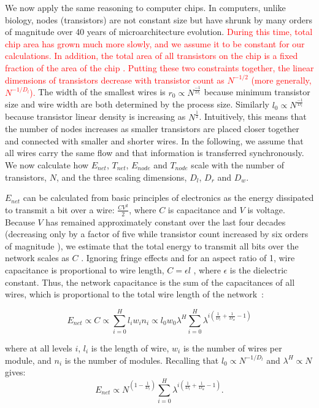 \documentclass[12pt]{article}
\newcommand{\red}[1]{\textcolor{red}{#1}}
\begin{document}
We now apply the same reasoning to computer chips. 
In computers, unlike biology,  nodes (transistors) 
are not constant size but have shrunk by many orders of magnitude over 40
years of microarchitecture evolution.  \red{During this time, total chip area has grown
much more slowly, and we assume it to be constant for our
calculations.   In addition, the total area of all transistors on the
chip is a fixed fraction of the area of the chip \cite{moses08}. 
Putting these two constraints together, the linear dimensions of transistors
decrease with transistor count as $N^{-1/2}$ (more generally,
$N^{-1/D_l}$). } The width of the smallest wires is 
$r_0 \propto N^{\frac{-1}{D_l}}$ because minimum
transistor size and wire width are both determined by the process size.
Similarly $l_0 \propto  N^{\frac{-1}{D_l}}$ because transistor linear density
is increasing as $N^{\frac{1}{2}}$.
Intuitively, this means
that the number of nodes increases as smaller transistors are placed closer
together and connected with smaller and shorter wires. In the following,
we assume that all wires carry the same flow and that information is
transferred synchronously. We now calculate how $E_{net}$, $T_{net}$,
$E_{node}$ and $T_{node}$ scale with the number of transistors, $N$, and the three
scaling dimensions, $D_l$, $D_r$ and $D_w$.

$E_{net}$ can be calculated from basic principles of electronics as the energy
dissipated to transmit a bit over a wire: $\frac{CV^2}{2}$, where $C$ is
capacitance and $V$ is voltage.  Because $V$ has remained approximately
constant over the last four decades (decreasing only by a factor of five while
transistor count increased by six orders of magnitude \cite{ning07}), we
estimate that the total energy to transmit all bits over the network scales as
$C$ \cite{bingham08}.  Ignoring fringe effects and for an aspect ratio of 1,
wire capacitance is proportional to wire length, $C = \epsilon l$
\cite{wilhelm95}, where $\epsilon$ is the dielectric constant. Thus, the
network capacitance is the sum of the capacitances of all wires, which is
proportional to the total wire length of the network~\cite{donath79}:

\begin{equation}
  \label{eq:ChipsEnet}
  E_{net} \propto C \propto  \sum_{i=0}^H l_i w_i n_i \propto l_0 w_0 \lambda^H
\sum_{i=0}^H \lambda^{i \left( \frac{1}{D_l} + \frac{1}{D_w} -1  \right)} 
\end{equation}

\noindent where at all levels $i$, $l_i$ is the length of wire, $w_i$ is the number of wires per
module, and $n_i$ is the number of modules. Recalling that
$l_0 \propto N^{-1/D_l}$ and $\lambda^H \propto N$ gives: 
\begin{equation}
\label{eq:comp-Enet}
  E_{net}  \propto  N^{(1- \frac{1}{D_l})} \sum_{i=0}^H \lambda^{i \left( 
\frac{1}{D_l} + \frac{1}{D_w} -1 \right)} .
\end{equation}
\end{document}
